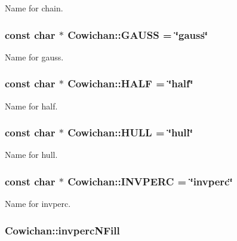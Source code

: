 Name for chain. \hypertarget{class_cowichan_b51b18cab3bd7cab0f3eb5c10f4cce0a}{
\subsubsection[{GAUSS}]{\setlength{\rightskip}{0pt plus 5cm}const char $\ast$ {\bf Cowichan::GAUSS} = \char`\"{}gauss\char`\"{}}}
\label{class_cowichan_b51b18cab3bd7cab0f3eb5c10f4cce0a}


Name for gauss. \hypertarget{class_cowichan_6ef0b7dddca7331c9bfb2acd0ea60088}{
\subsubsection[{HALF}]{\setlength{\rightskip}{0pt plus 5cm}const char $\ast$ {\bf Cowichan::HALF} = \char`\"{}half\char`\"{}}}
\label{class_cowichan_6ef0b7dddca7331c9bfb2acd0ea60088}


Name for half. \hypertarget{class_cowichan_c0ca862afefd5d6ab8fefdbf47428b21}{
\subsubsection[{HULL}]{\setlength{\rightskip}{0pt plus 5cm}const char $\ast$ {\bf Cowichan::HULL} = \char`\"{}hull\char`\"{}}}
\label{class_cowichan_c0ca862afefd5d6ab8fefdbf47428b21}


Name for hull. \hypertarget{class_cowichan_0665b5094fb551e4f000502ec752a4e8}{
\subsubsection[{INVPERC}]{\setlength{\rightskip}{0pt plus 5cm}const char $\ast$ {\bf Cowichan::INVPERC} = \char`\"{}invperc\char`\"{}}}
\label{class_cowichan_0665b5094fb551e4f000502ec752a4e8}


Name for invperc. \hypertarget{class_cowichan_c637b7380ab889ed42652790a3c542c6}{
\subsubsection[{invpercNFill}]{ {\bf Cowichan::invpercNFill}}}
\label{class_cowichan_c637b7380ab889ed42652790a3c542c6}


